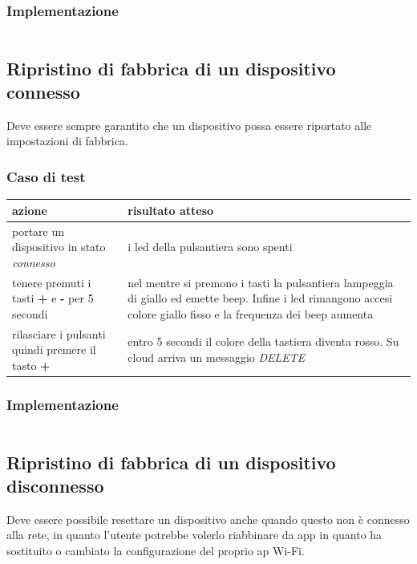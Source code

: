 \documentclass[12pt,a4paper,twoside,titlepage]{book}
\begin{document}
\subsubsection{Implementazione}
\inputminted{python3}{src/test_ota.py}

\subsection{Ripristino di fabbrica di un dispositivo connesso}
\label{section:test_factory_reset}

Deve essere sempre garantito che un dispositivo possa essere riportato alle impostazioni di fabbrica.

\subsubsection{Caso di test}
\begin{center}
\begin{tabular}{| p{} | p{} |}
    \hline \textbf{azione} & \textbf{risultato atteso} \\
    \hline portare un dispositivo in stato \textit{connesso} & i \acrshort{led} della pulsantiera sono spenti \\
    \hline tenere premuti i tasti \textbf{+} e \textbf{-} per 5 secondi & nel mentre si premono i tasti la pulsantiera lampeggia di giallo ed emette beep. Infine i \acrshort{led} rimangono accesi colore giallo fisso e la frequenza dei beep aumenta \\
    \hline rilasciare i pulsanti quindi premere il tasto \textbf{+} & entro 5 secondi il colore della tastiera diventa rosso. Su cloud arriva un messaggio \textit{DELETE} \\
    \hline
\end{tabular}
\end{center}

\subsubsection{Implementazione}
\inputminted{python3}{src/test_factory_reset.py}

\subsection{Ripristino di fabbrica di un dispositivo disconnesso}
\label{section:test_factory_reset_unbounded}

Deve essere possibile resettare un dispositivo anche quando questo non è connesso
alla rete, in quanto l'utente potrebbe volerlo riabbinare da app in quanto ha sostituito
o cambiato la configurazione del proprio \acrshort{ap} Wi-Fi.
\end{document}
